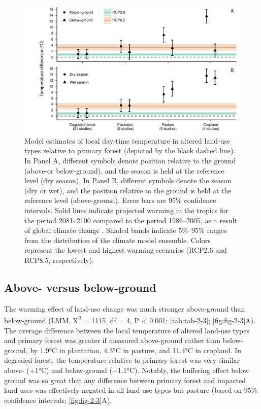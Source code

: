 \documentclass[12pt,a4paper,]{report}
\theoremstyle{definition}
\theoremstyle{definition}
\theoremstyle{definition}
\theoremstyle{remark}
\begin{document}
\begin{figure}
\centering
\includegraphics{figs/fig2.3.pdf}
\caption{\label{fig:fig-2-3}Model estimates of local day-time temperature in altered land-use types relative to primary forest (depicted by the black dashed line). In Panel A, different symbols denote position relative to the ground (above-or below-ground), and the season is held at the reference level (dry season). In Panel B, different symbols denote the season (dry or wet), and the position relative to the ground is held at the reference level (above-ground). Error bars are 95\% confidence intervals. Solid lines indicate projected warming in the tropics for the period 2081–2100 compared to the period 1986–2005, as a result of global climate change \citep{ipcc_2013}. Shaded bands indicate 5\%–95\% ranges from the distribution of the climate model ensemble. Colors represent the lowest and highest warming scenarios (RCP2.6 and RCP8.5, respectively).}
\end{figure}

\subsection{Above- versus
below-ground}\label{above--versus-below-ground}

The warming effect of land-use change was much stronger above-ground
than below-ground (LMM, Χ\textsuperscript{2} = 1115, df = 4, P
\textless{} 0.001; \autoref{tab:tab-2-3}; \autoref{fig:fig-2-3}A). The
average difference between the local temperature of altered land-use
types and primary forest was greater if measured above-ground rather
than below-ground, by 1.9°C in plantation, 4.3°C in pasture, and 11.4°C
in cropland. In degraded forest, the temperature relative to primary
forest was very similar above- (+1°C) and below-ground (+1.1°C).
Notably, the buffering effect below ground was so great that any
difference between primary forest and impacted land uses was effectively
negated in all land-use types but pasture (based on 95\% confidence
intervals; \autoref{fig:fig-2-3}A).
\end{document}
